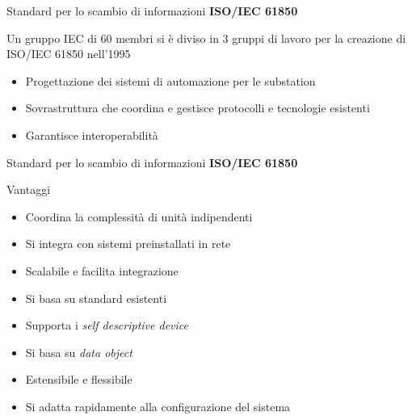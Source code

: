 \begin{frame}{Standard per lo scambio di informazioni}
	\textbf{ISO/IEC 61850}
	\begin{block}{}
		Un gruppo IEC di 60 membri si è diviso in 3 gruppi di lavoro per la creazione di ISO/IEC 61850 nell'1995
	\end{block}
	\pause
	\begin{itemize}[<+- | alert@+>]
		\item Progettazione dei sistemi di automazione per le substation
		\item Sovrastruttura che coordina e gestisce protocolli e tecnologie esistenti
		\item Garantisce interoperabilità
	\end{itemize}
\end{frame}

\begin{frame}{Standard per lo scambio di informazioni}
	\textbf{ISO/IEC 61850}
	\begin{block}{Vantaggi}
	\begin{itemize}[<+- | alert@+>]
		\item Coordina la complessità di unità indipendenti
		\item Si integra con sistemi preinstallati in rete
		\item Scalabile e facilita integrazione
		\item Si basa su standard esistenti
		\item Supporta i \textit{self descriptive device}%
		\item Si basa su \textit{data object}%
		\item Estensibile e flessibile
		\item Si adatta rapidamente alla configurazione del sistema
	\end{itemize}
	\end{block}
\end{frame}




